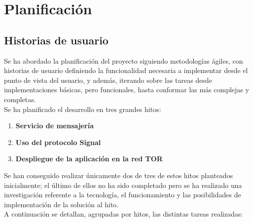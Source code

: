 \chapter{Planificación}

\section{Historias de usuario}

Se ha abordado la planificación del proyecto siguiendo metodologías ágiles, con historias de usuario definiendo la funcionalidad necesaria a implementar desde el punto de vista del usuario, y además, iterando sobre las tareas desde implementaciones básicas, pero funcionales, hasta conformar las más complejas y completas. \\ 

Se ha planificado el desarrollo en tres grandes hitos:

\begin{enumerate}
	\item \textbf{Servicio de mensajería}
	\item \textbf{Uso del protocolo Signal}
	\item \textbf{Despliegue de la aplicación en la red TOR}
\end{enumerate}

Se han conseguido realizar únicamente dos de tres de estos hitos planteados inicialmente; el último de ellos no ha sido completado pero se ha realizado una investigación referente a la tecnología, el funcionamiento y las posibilidades de implementación de la solución al hito. \\ 

A continuación se detallan, agrupadas por hitos, las distintas tareas realizadas: \\ 



